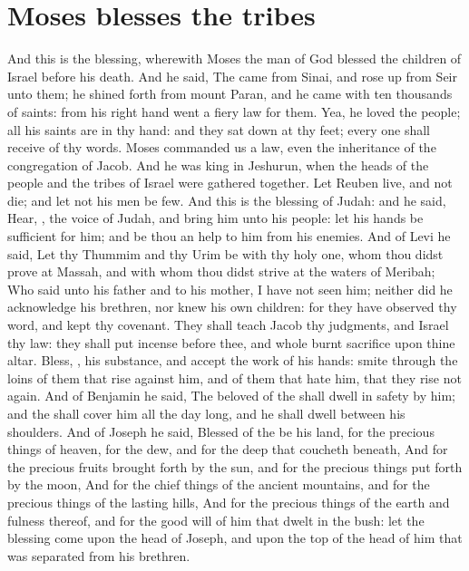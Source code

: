 \section*{Moses blesses the tribes}
\begin{biblechapter} %
\verse And this is the blessing, wherewith Moses the man of God blessed the children of Israel before his death.
\verse And he said, The \LORD came from Sinai, and rose up from Seir unto them; he shined forth from mount Paran, and he came with ten thousands of saints: from his right hand went a fiery law for them.
\verse Yea, he loved the people; all his saints are in thy hand: and they sat down at thy feet; every one shall receive of thy words.
\verse Moses commanded us a law, even the inheritance of the congregation of Jacob.
\verse And he was king in Jeshurun, when the heads of the people and the tribes of Israel were gathered together.
\verse Let Reuben live, and not die; and let not his men be few.
\verse And this is the blessing of Judah: and he said, Hear, \LORD, the voice of Judah, and bring him unto his people: let his hands be sufficient for him; and be thou an help to him from his enemies.
\verse And of Levi he said, Let thy Thummim and thy Urim be with thy holy one, whom thou didst prove at Massah, and with whom thou didst strive at the waters of Meribah;
\verse Who said unto his father and to his mother, I have not seen him; neither did he acknowledge his brethren, nor knew his own children: for they have observed thy word, and kept thy covenant.
\verse They shall teach Jacob thy judgments, and Israel thy law: they shall put incense before thee, and whole burnt sacrifice upon thine altar.
\verse Bless, \LORD, his substance, and accept the work of his hands: smite through the loins of them that rise against him, and of them that hate him, that they rise not again.
\verse And of Benjamin he said, The beloved of the \LORD shall dwell in safety by him; and the \LORD shall cover him all the day long, and he shall dwell between his shoulders.
\verse And of Joseph he said, Blessed of the \LORD be his land, for the precious things of heaven, for the dew, and for the deep that coucheth beneath,
\verse And for the precious fruits brought forth by the sun, and for the precious things put forth by the moon,
\verse And for the chief things of the ancient mountains, and for the precious things of the lasting hills,
\verse And for the precious things of the earth and fulness thereof, and for the good will of him that dwelt in the bush: let the blessing come upon the head of Joseph, and upon the top of the head of him that was separated from his brethren.

\end{biblechapter}
